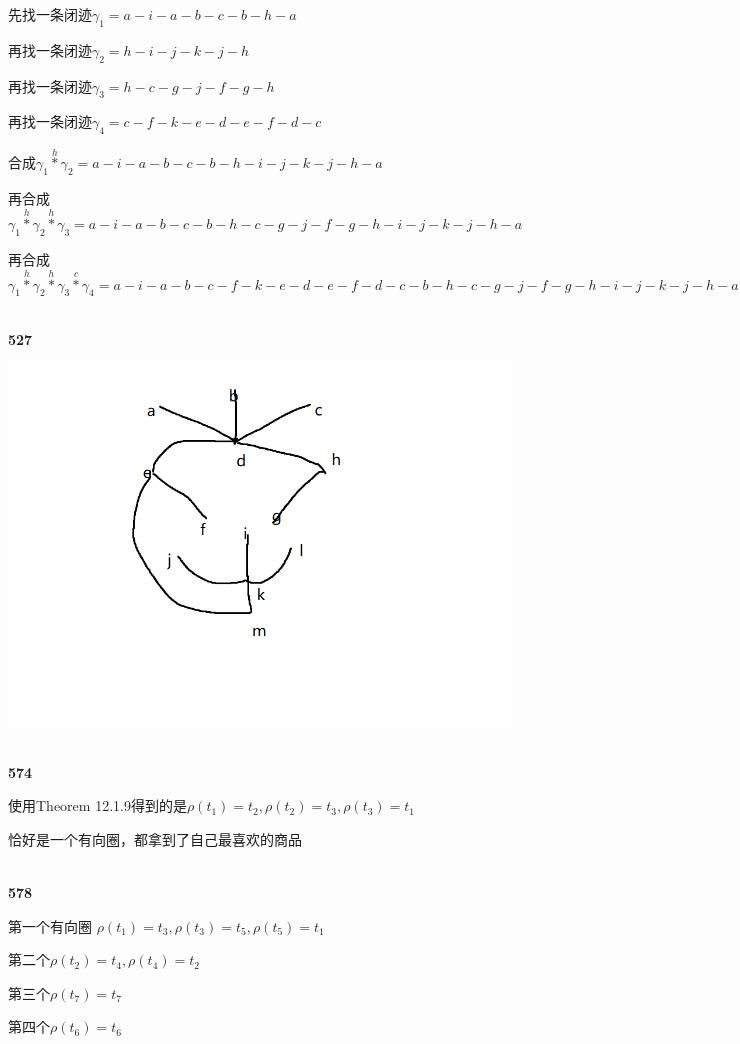\documentclass[UTF8]{ctexart}
\begin{document}
    先找一条闭迹$\gamma _1=a-i-a-b-c-b-h-a$ 

    再找一条闭迹$\gamma _2=h-i-j-k-j-h$

    再找一条闭迹$\gamma _3=h-c-g-j-f-g-h$

    再找一条闭迹$\gamma _4=c-f-k-e-d-e-f-d-c$

    合成$\gamma _1 \mathop{*}\limits ^{h} \gamma _2=a-i-a-b-c-b-h-i-j-k-j-h-a$
    
    再合成$\gamma _1 \mathop{*}\limits ^{h} \gamma _2 \mathop{*}\limits ^{h} \gamma _3= 
    a-i-a-b-c-b-h-c-g-j-f-g-h-i-j-k-j-h-a
    $

    再合成$\gamma _1 \mathop{*}\limits ^{h} \gamma _2 \mathop{*}\limits ^{h} \gamma _3
    \mathop{*}\limits ^{c} \gamma _4=
    a-i-a-b-c-f-k-e-d-e-f-d-c-b-h-c-g-j-f-g-h-i-j-k-j-h-a
    $

    ~\\
    \noindent\textbf{527}

    \includegraphics{2.png}

    ~\\
    \noindent\textbf{574}

    使用Theorem 12.1.9得到的是$\rho (t_1)=t_2, \rho (t_2)=t_3 ,
    \rho (t_3)=t_1$

    恰好是一个有向圈，都拿到了自己最喜欢的商品

    ~\\
    \noindent\textbf{578}

    第一个有向圈
    $\rho (t_1)=t_3, \rho (t_3)=t_5, \rho (t_5)=t_1$

    第二个$\rho (t_2)=t_4, \rho (t_4)=t_2$

    第三个$\rho (t_7)=t_7$

    第四个$\rho (t_6)=t_6$
\end{document}
